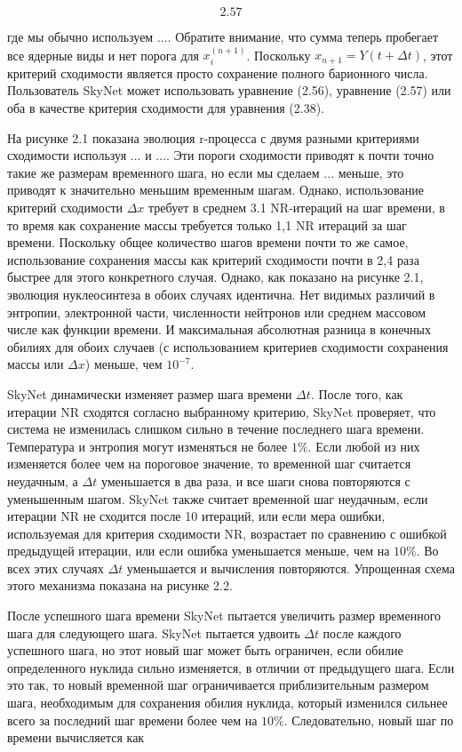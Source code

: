 \documentclass[%
bachelor,    %
natbib,      %
subf,        %
href,        %
colorlinks,  %
]{disser}
\begin{document}
$$2.57$$

где мы обычно используем $...$. Обратите внимание, что сумма теперь пробегает все ядерные виды и нет порога для $x_i^{(n+1)}$. Поскольку  $x_{n + 1} = Y(t + \Delta t)$, этот критерий сходимости является просто сохранение полного барионного числа. Пользователь SkyNet может использовать уравнение (2.56), уравнение (2.57) или оба в качестве критерия сходимости для уравнения (2.38).

На рисунке 2.1 показана эволюция r-процесса с двумя разными критериями сходимости
используя $...$ и $...$. Эти пороги сходимости приводят к почти точно такие же размерам временного шага, но если мы сделаем $...$ меньше, это приводят к значительно меньшим временным шагам. Однако, использование критерий сходимости $\Delta x$ требует в среднем 3.1 NR-итераций на шаг времени, в то время как сохранение массы требуется только 1,1 NR итераций за шаг времени. Поскольку общее количество шагов времени почти то же самое, использование сохранения массы как критерий сходимости почти в 2,4 раза быстрее для этого конкретного случая. Однако, как показано на рисунке 2.1, эволюция нуклеосинтеза в обоих случаях идентична. Нет видимых различий в энтропии, электронной части, численности нейтронов или среднем массовом числе как функции времени. И максимальная абсолютная разница в конечных обилиях для обоих случаев (с использованием критериев сходимости сохранения массы или $\Delta x$) меньше, чем $10^{-7}$.

SkyNet динамически изменяет размер шага времени $\Delta t$. После того, как итерации NR сходятся согласно выбранному критерию, SkyNet проверяет, что система не изменилась слишком сильно в течение последнего шага времени. Температура и энтропия могут изменяться не более $1\%$. Если любой из них изменяется более чем на пороговое значение, то временной шаг считается неудачным, а $\Delta t$ уменьшается в два раза, и все шаги снова повторяются с уменьшенным шагом. SkyNet также считает временной шаг неудачным, если итерации NR не сходится после 10 итераций, или если мера ошибки, используемая для критерия сходимости NR, возрастает по сравнению с ошибкой предыдущей итерации, или если ошибка уменьшается меньше, чем на $10\%$. Во всех этих случаях $\Delta t$ уменьшается и вычисления повторяются. Упрощенная схема этого механизма показана на рисунке 2.2.

После успешного шага времени SkyNet пытается увеличить размер временного шага для следующего шага. SkyNet пытается удвоить $\Delta t$ после каждого успешного шага, но этот новый шаг может быть ограничен, если обилие определенного нуклида  сильно изменяется, в отличии от предыдущего шага. Если это так, то новый временной шаг ограничивается приблизительным размером шага, необходимым для сохранения обилия нуклида, который изменился сильнее всего за последний шаг времени более чем на $10\%$. Следовательно, новый шаг по времени вычисляется как
\end{document}

